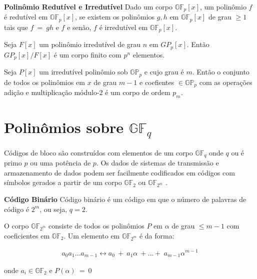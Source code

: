 \begin{definition} {\bf Polinômio Redutível e Irredutível} \label{PolRedIrred}  Dado um corpo $\mathbb{GF}_p[x]$, um polinômio $f$  é redutível em $\mathbb{GF}_p[x]$, se existem os polinômios $g, h$ em $\mathbb{GF}_p[x]$ de grau $\geq 1$ tais que $f\ =\ gh$ e $f$ e senão, $f$ é irredutível em $\mathbb{GF}_p[x]$.
\end{definition}

\begin{proposition}
Seja $F[x]$ um polinômio irredutível de grau $n$ em $GP_p[x]$. Então $GP_p[x]/F[x]$ é um corpo finito com $p^n$ elementos.
\end{proposition}

\begin{theorem} Seja $P[x]$ um irredutível polinômio sob $\mathbb{GP}_p$ e cujo grau é $m$. Então o conjunto de todos os polinômios em $x$ de grau $m-1$ e coefientes $\in \mathbb{GP}_p$ com as operações adição e multiplicação módulo-$2$ é um corpo de ordem $p_m$.
\end{theorem}

\section{Polinômios sobre $\mathbb{GF}_q$}

Códigos de bloco são construídos com elementos de um corpo $\mathbb{GF}_q$ onde $q$ ou é primo $p$ ou uma potência de $p$. Os dados de sistemas de transmissão e armazenamento de dados podem ser facilmente codificados em códigos com símbolos gerados a partir de um corpo $\mathbb{GF}_2$ ou $\mathbb{GF}_{2^m}$ \cite{Lin:1983}.

\begin{definition} {\bf Código Binário} \label{CodBin}  Código binário é um código em que o número de palavras de código é $2^m$, ou seja, $q = 2$.
\end{definition}

O corpo $\mathbb{GF}_{2^m}$ consiste de todos os polinômios $P$ em $\alpha$ de grau $\leq m-1$ com coeficientes em $\mathbb{GF}_2$. Um elemento em $\mathbb{GF}_{2^m}$ é da forma: 

\begin{align*}
a_0a_1 \ldots a_{m-1} \leftrightarrow a_0\ +\ a_1\alpha\ + \ldots +\ a_{m-1}\alpha^{m-1}
\end{align*}

onde $a_i \in \mathbb{GF}_2$ e $P(\alpha)\ =\ 0$

